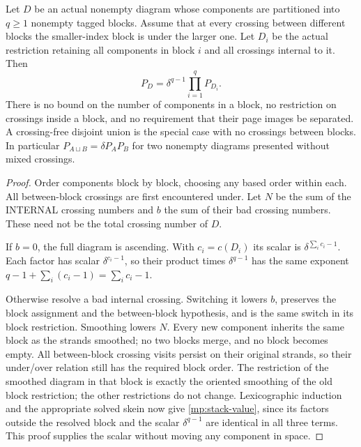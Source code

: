 \begin{theorem}
\label{mp:stack}
Let $D$ be an actual nonempty diagram whose components are partitioned
into $q\geq1$ nonempty tagged blocks. Assume that at every crossing
between different blocks the smaller-index block is under the larger
one. Let $D_i$ be the actual restriction retaining all components in
block $i$ and all crossings internal to it. Then
\begin{equation}\label{mp:stack-value}
 P_D=\delta^{q-1}\prod_{i=1}^qP_{D_i}.
\end{equation}
There is no bound on the number of components in a block, no restriction
on crossings inside a block, and no requirement that their page images
be separated. A crossing-free disjoint union is the special case with
no crossings between blocks. In particular
$P_{A\sqcup B}=\delta P_AP_B$ for two nonempty diagrams presented
without mixed crossings.
\end{theorem}
\begin{proof}
Order components block by block, choosing any based order within each.
All between-block crossings are first encountered under. Let $N$ be
the sum of the INTERNAL crossing numbers and $b$ the sum of their bad
crossing numbers. These need not be the total crossing number of $D$.

If $b=0$, the full diagram is ascending. With $c_i=c(D_i)$ its scalar
is $\delta^{\sum_i c_i-1}$. Each factor has scalar
$\delta^{c_i-1}$, so their product times $\delta^{q-1}$ has the same
exponent $q-1+\sum_i(c_i-1)=\sum_i c_i-1$.

Otherwise resolve a bad internal crossing. Switching it lowers $b$,
preserves the block assignment and the between-block hypothesis, and
is the same switch in its block restriction. Smoothing lowers $N$.
Every new component inherits the same block as the strands smoothed;
no two blocks merge, and no block becomes empty. All between-block
crossing visits persist on their original strands, so their under/over
relation still has the required block order. The restriction of the
smoothed diagram in that block is exactly the oriented smoothing of
the old block restriction; the other restrictions do not change.
Lexicographic induction and the appropriate solved skein now give
\eqref{mp:stack-value}, since its factors outside the resolved block
and the scalar $\delta^{q-1}$ are identical in all three terms.
This proof supplies the scalar without moving any component in space.
\end{proof}

